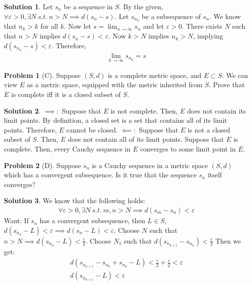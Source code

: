 \documentclass[12pt]{article}
\theoremstyle{definition} %
\newtheorem{solution}{Solution}
\newtheorem{problem}{Problem}
\theoremstyle{plain} %
\begin{document}
\begin{solution}
    Let \(s_{n} \) be a sequence in \(S\). By the given, \(\forall \varepsilon >0,\exists N\ s.t. \ n>N\implies d(s_{n}-s)\). Let \(s_{n_{k}} \) be a subsequence of \(s_{n} \). We know that \(n_{k} >k\) for all \(k\). 
    Now let \(s=\lim_{n \to \infty} s_{n} \) and let \(\varepsilon >0\). There exists \(N\) such that \(n>N\) implies \(d(s_{n} -s)<\varepsilon \). Now \(k>N\) implies \(n_{k} >N\), implying \(d(s_{n_{k} }-s )<\varepsilon \). Therefore,
    \begin{align}
        \lim_{k \to \infty} s_{n_{k} }=s 
    \end{align}   
\end{solution}
\begin{problem}[C]
    Suppose \((S,d)\) is a complete metric space, and \(E \subset S\). We can view \(E\) as a metric space, equipped with the metric inherited from \(S\). Prove that \(E\) is complete iff it is a closed subset of \(S\). 
\end{problem}

\begin{solution}
    \(\implies :\) Suppose that \(E\) is not complete. Then, \(E\) does not contain its limit points. By definition, a closed set is a set that contains all of its limit points. Therefore, \(E\) cannot be closed.
    \(\impliedby :\) Suppose that \(E\) is not a closed subset of \(S\). Then, \(E\) does not contain all of its limit points. Suppose that \(E\) is complete. Then, every Cauchy sequence in \(E\) converges to some limit point in \(E\).
\end{solution}
\begin{problem}[D]
    Suppose \(s_{n} \) is a Cauchy sequence in a metric space \((S,d)\) which has a convergent subsequence. Is it true that the sequence \(s_{n} \) itself converges?
\end{problem}

\begin{solution}
   We know that the following holds:
   \begin{align}
    \forall \varepsilon >0, \exists N\ s.t. \ m,n>N\implies d(s_{m} -s_{n} )<\varepsilon 
   \end{align} 
   Want: If \(s_{n} \) has a convergent subsequence, then \(L\in S\), \(d(s_{n_{k} }-L )<\varepsilon\implies d(s_{n} -L)<\varepsilon  \).
   Choose \(N\) such that \(n>N\implies d(s_{n_{k}  } -L)<\frac{\varepsilon}{2}\).
   Choose \(N_{1} \) such that \(d(s_{n_{k+1} }-s_{n_{k} }  )<\frac{\varepsilon}{2}\)  
   Then we get:
   \begin{align}
    d(s_{n_{k+1} }-s_{n_{k} }+s_{n_{k} }-L   )<\frac{\varepsilon}{2}+\frac{\varepsilon}{2}<\varepsilon \\[10pt] 
    d(s_{n_{k+1} }-L )<\varepsilon 
   \end{align}
\end{solution}
\end{document}
